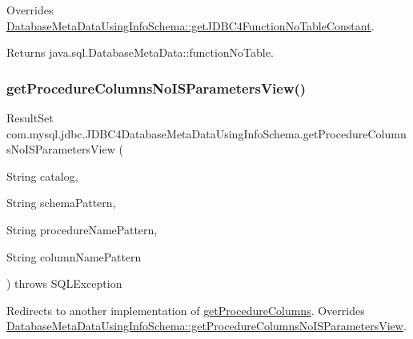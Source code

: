 Overrides \mbox{\hyperlink{classcom_1_1mysql_1_1jdbc_1_1_database_meta_data_using_info_schema_a29cf035125a66f19f874935b8cc8138a}{Database\+Meta\+Data\+Using\+Info\+Schema\+::get\+J\+D\+B\+C4\+Function\+No\+Table\+Constant}}.

\begin{DoxyReturn}{Returns}
java.\+sql.\+Database\+Meta\+Data\+::function\+No\+Table. 
\end{DoxyReturn}
\mbox{\label{classcom_1_1mysql_1_1jdbc_1_1_j_d_b_c4_database_meta_data_using_info_schema_aa9b5467b9c047a20b0940d295d98d9cf}} 
\subsubsection{\texorpdfstring{get\+Procedure\+Columns\+No\+I\+S\+Parameters\+View()}{getProcedureColumnsNoISParametersView()}}
{\footnotesize\ttfamily Result\+Set com.\+mysql.\+jdbc.\+J\+D\+B\+C4\+Database\+Meta\+Data\+Using\+Info\+Schema.\+get\+Procedure\+Columns\+No\+I\+S\+Parameters\+View (\begin{DoxyParamCaption}\item[{String}]{catalog,  }\item[{String}]{schema\+Pattern,  }\item[{String}]{procedure\+Name\+Pattern,  }\item[{String}]{column\+Name\+Pattern }\end{DoxyParamCaption}) throws S\+Q\+L\+Exception\hspace{0.3cm}{\ttfamily [protected]}}

Redirects to another implementation of \mbox{\hyperlink{classcom_1_1mysql_1_1jdbc_1_1_database_meta_data_using_info_schema_a2bb17e6501848d501ed65ee886ed4225}{get\+Procedure\+Columns}}. Overrides \mbox{\hyperlink{classcom_1_1mysql_1_1jdbc_1_1_database_meta_data_using_info_schema_a39f4d86800a2ecfb0e22a88485a92aae}{Database\+Meta\+Data\+Using\+Info\+Schema\+::get\+Procedure\+Columns\+No\+I\+S\+Parameters\+View}}.

